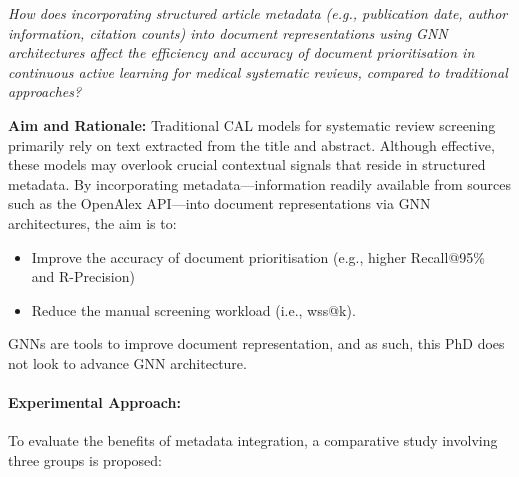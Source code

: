\documentclass[10pt,oneside]{book}
\begin{document}
\emph{How does incorporating structured article metadata (e.g., publication date, author information, citation counts) into document representations using GNN architectures affect the efficiency and accuracy of document prioritisation in continuous active learning for medical systematic reviews, compared to traditional approaches?}

\textbf{Aim and Rationale:}
Traditional CAL models for systematic review screening primarily rely on text extracted from the title and abstract. Although effective, these models may overlook crucial contextual signals that reside in structured metadata. By incorporating metadata—information readily available from sources such as the OpenAlex API—into document representations via GNN architectures, the aim is to: \begin{itemize} \item Improve the accuracy of document prioritisation (e.g., higher Recall@95\% and R-Precision)
\item Reduce the manual screening workload (i.e., wss@k). \end{itemize}

GNNs are tools to improve document representation, and as such, this PhD does not look to advance GNN architecture. 

\paragraph{Experimental Approach: } 

To evaluate the benefits of metadata integration, a comparative study involving three groups is proposed:
\end{document}

